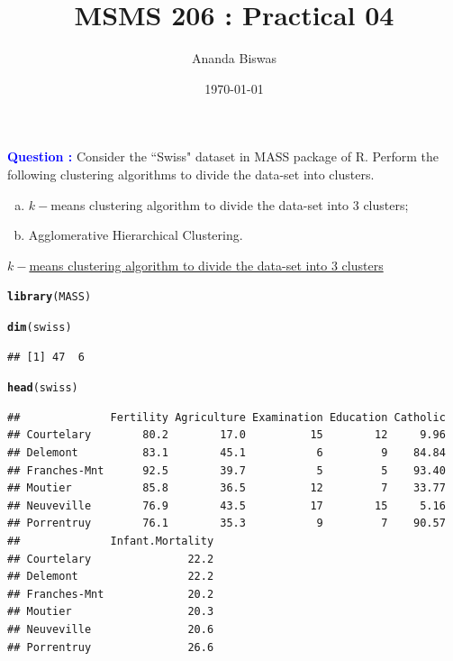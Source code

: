 \documentclass[11pt, a4paper]{article}\usepackage[]{graphicx}\usepackage[]{xcolor}
\title{MSMS 206 : Practical 04}
\author{Ananda Biswas}
\date{\today}
\makeatletter
\newcommand{\hldef}[1]{\textcolor[rgb]{0.345,0.345,0.345}{#1}}%
\newcommand{\hlkwd}[1]{\textcolor[rgb]{0.737,0.353,0.396}{\textbf{#1}}}%
\newenvironment{kframe}{%
 \def\at@end@of@kframe{}%
 \ifinner\ifhmode%
  \def\at@end@of@kframe{\end{minipage}}%
  \begin{minipage}{\columnwidth}%
 \fi\fi%
 \def\FrameCommand##1{\hskip\@totalleftmargin \hskip-\fboxsep
 \colorbox{shadecolor}{##1}\hskip-\fboxsep
     \hskip-\linewidth \hskip-\@totalleftmargin \hskip\columnwidth}%
 \MakeFramed {\advance\hsize-\width
   \@totalleftmargin\z@ \linewidth\hsize
   \@setminipage}}%
 {\par\unskip\endMakeFramed%
 \at@end@of@kframe}
\newenvironment{knitrout}{}{} %
\makeatother
\begin{document}
\maketitle


 \hspace{0.2cm} \textcolor{blue}{\textbf{Question : }} Consider the ``Swiss" dataset in MASS package of R. Perform the following clustering algorithms to divide the data-set into clusters.

\begin{enumerate}[(a)]

\item $k-$means clustering algorithm to divide the data-set into 3 clusters;
\item Agglomerative Hierarchical Clustering.

\end{enumerate}


\faArrowAltCircleRight[regular] \hspace{0.2cm} \underline{$k-$means clustering algorithm to divide the data-set into 3 clusters}

\begin{knitrout}
\color{fgcolor}\begin{kframe}
\begin{alltt}
\hlkwd{library}\hldef{(MASS)}

\hlkwd{dim}\hldef{(swiss)}
\end{alltt}
\begin{verbatim}
## [1] 47  6
\end{verbatim}
\begin{alltt}
\hlkwd{head}\hldef{(swiss)}
\end{alltt}
\begin{verbatim}
##              Fertility Agriculture Examination Education Catholic
## Courtelary        80.2        17.0          15        12     9.96
## Delemont          83.1        45.1           6         9    84.84
## Franches-Mnt      92.5        39.7           5         5    93.40
## Moutier           85.8        36.5          12         7    33.77
## Neuveville        76.9        43.5          17        15     5.16
## Porrentruy        76.1        35.3           9         7    90.57
##              Infant.Mortality
## Courtelary               22.2
## Delemont                 22.2
## Franches-Mnt             20.2
## Moutier                  20.3
## Neuveville               20.6
## Porrentruy               26.6
\end{verbatim}
\end{kframe}
\end{knitrout}
\end{document}
